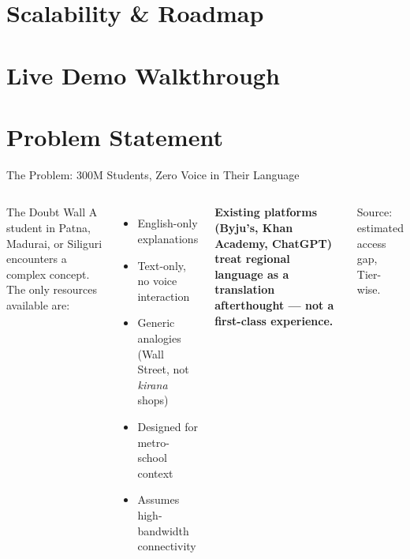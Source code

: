 \documentclass[aspectratio=169, 12pt]{beamer}
\newcommand{\cross}{\textcolor{red}{\faTimesCircle}}
\begin{document}
\section{Scalability \& Roadmap}
\section{Live Demo Walkthrough}

\section{Problem Statement}

\begin{frame}{The Problem: 300M Students, Zero Voice in Their Language}
  \begin{columns}[T]
      \begin{alertblock}{The Doubt Wall}
        A student in Patna, Madurai, or Siliguri encounters a complex
        concept. The only resources available are:
      \end{alertblock}
      \vspace{6pt}
      \begin{itemize}
        \item[\cross] English-only explanations
        \item[\cross] Text-only, no voice interaction
        \item[\cross] Generic analogies (Wall Street, not \emph{kirana} shops)
        \item[\cross] Designed for metro-school context
        \item[\cross] Assumes high-bandwidth connectivity
      \end{itemize}
      \vspace{8pt}
      \textbf{Existing platforms (Byju's, Khan Academy, ChatGPT) treat
      regional language as a translation afterthought --- not a
      first-class experience.}

      \vspace{2pt}
      {\scriptsize Source: estimated access gap, Tier-wise.}
  \end{columns}
\end{frame}
\end{document}
